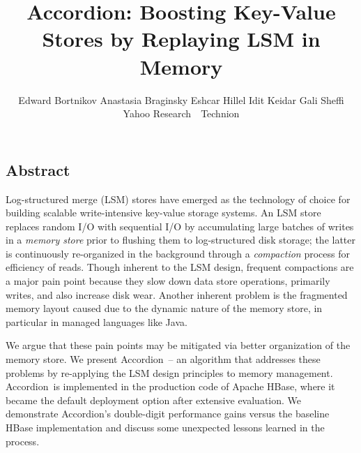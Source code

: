 \documentclass{vldb}
\newcommand{\remove}[1]{}
\newcommand{\tb}{\hspace{5mm}}
\newcommand{\sys}{Accordion}
\begin{document}
\date{}

\title{\Large \bf  \sys: Boosting Key-Value Stores by Replaying LSM in Memory}


\author{
Edward Bortnikov\footnotemark[1]  \tb
Anastasia Braginsky\footnotemark[1]  \tb
Eshcar Hillel\footnotemark[1] \tb 
Idit Keidar\footnotemark[1] \footnotemark[2] \tb
Gali Sheffi\footnotemark[1] \\
	\footnotemark[1] Yahoo Research\ \ \footnotemark[2] Technion  \\ [2mm]
} %

\maketitle




\subsection*{Abstract}

Log-structured merge (LSM) stores have emerged as the technology of choice for building scalable 
write-intensive key-value storage systems. An LSM store replaces random I/O with sequential 
I/O by accumulating large batches of writes in a \emph{memory store} prior to flushing them to log-structured 
disk storage; the latter is continuously re-organized in the background through a \emph{compaction}
process for efficiency of reads. Though inherent to the LSM design, frequent compactions are a major pain point 
because they slow down data store operations, primarily writes, and also increase disk wear. 
Another inherent problem is the fragmented memory layout caused due to the dynamic nature of the memory store, in particular in managed languages like Java. 

We argue that these pain points may be mitigated via better  organization of the memory store.
We present \sys\ -- an algorithm that addresses these problems by re-applying
the LSM design principles to memory management. 
\sys\ is implemented in the production code of Apache HBase, where it became the default deployment option 
after extensive evaluation. We demonstrate \sys's double-digit performance gains versus 
the baseline HBase implementation and discuss some unexpected lessons learned in the process. 
\end{document}
